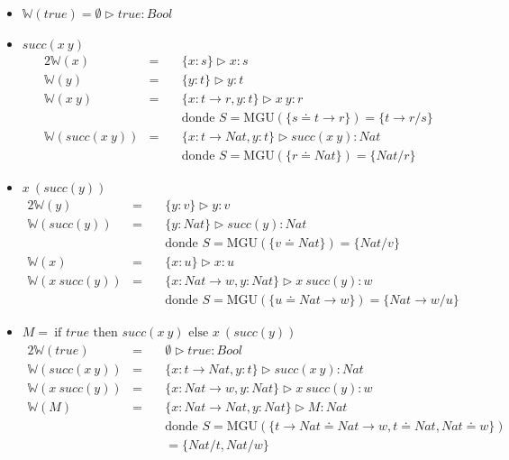 \documentclass{report}
\theoremstyle{definition} %
\newcommand{\tfunc}[2]{#1 \to #2}
\newcommand{\ifte}[3]{\ \text{if } #1 \text{ then } #2 \text{ else } #3}
\newcommand{\app}[2]{#1 \ #2} %
\newcommand{\tipa}[3]{#1 \rhd #2 : #3} %
\newcommand{\suc}[1]{succ(#1)}
\newcommand{\sustfor}[2]{#1/#2} %
\newcommand{\infer}[1]{\mathbb{W}(#1)}
\newcommand{\etipa}[2]{\tipa{\emptyset}{#1}{#2}} %
\newcommand{\unify}[2]{#1 \doteq #2}
\newcommand{\mgu}[2]{\text{MGU}(\{ \unify{#1}{#2} \})}
\begin{document}
\begin{itemize}
    \item $\infer{true} = \etipa{true}{Bool}$
    \item $\suc{\app{x}{y}}$
    \begin{alignat*}{2}
        \infer{x} &=\ &&\tipa{\{x:s\}}{x}{s}\\
        \infer{y} &=\ &&\tipa{\{y:t\}}{y}{t}\\
        \infer{\app{x}{y}} &=\
        &&\tipa
            {\{ x: \tfunc{t}{r}, y: t\}}
            {\app{x}{y}}
            {r}\\
        & &&\text{donde } S = \mgu{s}{\tfunc{t}{r}} = \{ \tfunc{t}{r} / s
        \}\\
        \infer{\suc{\app{x}{y}}} &=\
        &&\tipa
            {\{ x: \tfunc{t}{Nat}, y: t \}}
            { \suc{\app{x}{y}} }
            {Nat}\\
        & &&\text{donde } S = \mgu{r}{Nat} = \{ \sustfor{Nat}{r} \}
    \end{alignat*}

    \item $\app{x}{(\suc{y})}$
    \begin{alignat*}{2}
        \infer{y} &=\ &&\tipa{\{y:v\}}{y}{v}\\
        \infer{\suc{y}} &=\
            &&\tipa{\{y: Nat\}}{\suc{y}}{Nat}\\
            & &&\text{donde } S = \mgu{v}{Nat} = \{ \sustfor{Nat}{v} \} \\
        \infer{x} &=\ &&\tipa{\{x:u\}}{x}{u}\\
        \infer{\app{x}{\suc{y}}} &=\
        &&\tipa
            {\{ x: \tfunc{Nat}{w}, y:Nat \}}
            {\app{x}{\suc{y}}}
            {w}\\
        & &&\text{donde } S = \mgu{u}{\tfunc{Nat}{w}} = \{
        \sustfor{\tfunc{Nat}{w}}{u} \}
    \end{alignat*}
    \item $M = \ifte{true}{\suc{\app{x}{y}}}{\app{x}{(\suc{y})}}$
    \begin{alignat*}{2}
        \infer{true} &=\
            &&\etipa{true}{Bool}\\
        \infer{\suc{\app{x}{y}}} &=\
            &&\tipa
            {\{ x: \tfunc{t}{Nat}, y: t \}}
            { \suc{\app{x}{y}} }
            {Nat}\\
        \infer{\app{x}{\suc{y}}} &=\
            &&\tipa
            {\{ x: \tfunc{Nat}{w}, y:Nat \}}
            {\app{x}{\suc{y}}}
            {w}\\
        \infer{M} &=\
            &&\tipa
                {\{ x: \tfunc{Nat}{Nat}, y: Nat\}}
                {M}
                {Nat}\\
        & && \text{donde }
        S = \text{MGU}(\{
            \unify{\tfunc{t}{Nat}}{\tfunc{Nat}{w}},
            \unify{t}{Nat},
            \unify{Nat}{w}
        \})\\
        & &&= \{ \sustfor{Nat}{t}, \sustfor{Nat}{w} \}
    \end{alignat*}


\end{itemize}
\end{document}
